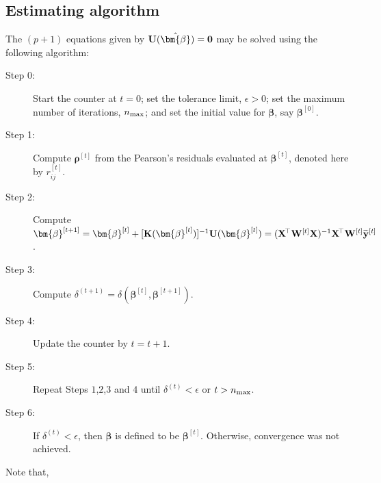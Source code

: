 \subsection{Estimating algorithm}
The $(p+1)$ equations given by ${\bf U}(\hat{\bm{\beta}})={\bf 0}$ may be solved using the following algorithm:

\begin{description}
\item[Step 0:] Start the counter at $t=0$; set the tolerance limit, $\epsilon>0$; set the maximum number of iterations, $n_{\rm max}$; and set the initial value for $\bm{\beta}$, say $\bm{\beta}^{[0]}$.
\item[Step 1:] Compute $\bm{\rho}^{[t]}$ from the Pearson's residuals evaluated at $\bm{\beta}^{[t]}$, denoted here by $r^{[t]}_{ij}$.
\item[Step 2:] Compute $\bm{\beta}^{[t+1]}=\bm{\beta}^{[t]} + [{\bf K}(\bm{\beta}^{[t]})]^{-1}{\bf U}(\bm{\beta}^{[t]})=({\bf X}^{\!\top}{\bf W}^{[t]}{\bf X})^{-1}{\bf X}^{\!\top}{\bf W}^{[t]}\widetilde{\bf y}^{[t]}$.
\item[Step 3:] Compute $\delta^{(t+1)}=\delta(\bm{\beta}^{[t]},\bm{\beta}^{[t+1]})$.
\item[Step 4:] Update the counter by $t=t+1$.
\item[Step 5:] Repeat Steps $1$,$2$,$3$ and $4$ until $\delta^{(t)}<\epsilon$ or $t>n_{\rm max}$.
\item[Step 6:] If $\delta^{(t)}<\epsilon$, then $\hat{\bm{\beta}}$ is defined to be $\bm{\beta}^{[t]}$. Otherwise, convergence was not achieved.
\end{description}
Note that,

